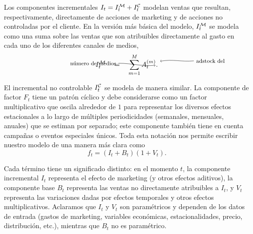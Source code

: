 Los componentes incrementales $I_t = I^{\mathcal{M}}_t + I^{\mathcal{C}}_t$ modelan ventas que resultan, respectivamente, directamente de acciones de marketing y de acciones no controladas por el cliente. En la versión más básica del modelo, $I^{\mathcal{M}}_t$ se modela como una suma sobre las ventas que son atribuibles directamente al gasto en cada uno de los diferentes canales de medios,
\begin{equation}\label{incremental}
\tikzmark{i} I^\calM_t ~~~=~~~ \sum_{m=1}^{\tikzmark{mtot} M} A^{(m)}_t \tikzmark{a}.
\begin{tikzpicture}[overlay,remember picture]
\node (M1) [left of = mtot, node distance = 9.5em, yshift=0.5em]{\footnotesize número de medios};
\node (M2) [left of = mtot, node distance = 0em, yshift=0.2em]{};
\draw[->, in=185, out=0] (M1.east) to (M2.west);
\node (A1) [right of = a, node distance = 9.5em, yshift=0.85em]{\footnotesize adstock del medio $m$};
\node (A2) [right of = a, node distance = 0em, yshift=0.8em]{};
\draw[->, in=10, out=185] (A1.west) to (A2.east);
\end{tikzpicture}
\end{equation}

El incremental no controlable $I^{\mathcal{C}}_t$ se modela de manera similar. La componente de factor $F_t$ tiene un patrón cíclico y debe considerarse como un factor multiplicativo que oscila alrededor de $1$ para representar los diversos efectos estacionales a lo largo de múltiples periodicidades (semanales, mensuales, anuales) que se estiman por separado; este componente también tiene en cuenta campañas o eventos especiales únicos. Toda esta notación nos permite escribir nuestro modelo de una manera más clara como
\[f_t = (I_t + B_t) (1 + V_t).\]

Cada término tiene un significado distinto: en el momento \(t\), la componente incremental \(I_t\) representa el efecto de marketing (y otros efectos aditivos), la componente base \(B_t\) representa las ventas no directamente atribuibles a \( I_t\), y \(V_t\) representa las variaciones dadas por efectos temporales y otros efectos multiplicativos. Aclaramos que \(I_t\) y \(V_t\) son paramétricos y dependen de los datos de entrada (gastos de marketing, variables económicas, estacionalidades, precio, distribución, etc.), mientras que \(B_t\) no es paramétrico.

